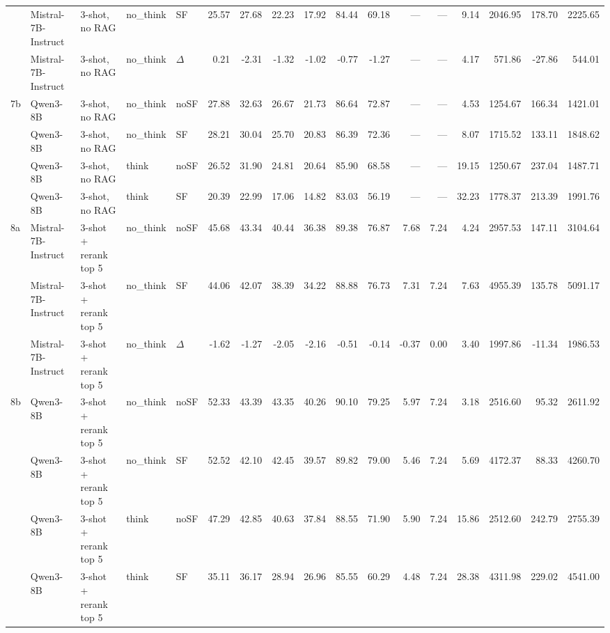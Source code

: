 \begin{landscape}
\begin{footnotesize}
\begin{longtable}{l l l l l r r r r r r r r r r r r}
 & Mistral-7B-Instruct & 3-shot, no RAG & no\_think & SF & 25.57 & 27.68 & 22.23 & 17.92 & 84.44 & 69.18 & --- & --- & 9.14 & 2046.95 & 178.70 & 2225.65 \\
 & Mistral-7B-Instruct & 3-shot, no RAG & no\_think & $\Delta$ & 0.21 & -2.31 & -1.32 & -1.02 & -0.77 & -1.27 & --- & --- & 4.17 & 571.86 & -27.86 & 544.01 \\
7b & Qwen3-8B & 3-shot, no RAG & no\_think & noSF & 27.88 & 32.63 & 26.67 & 21.73 & 86.64 & 72.87 & --- & --- & 4.53 & 1254.67 & 166.34 & 1421.01 \\
 & Qwen3-8B & 3-shot, no RAG & no\_think & SF & 28.21 & 30.04 & 25.70 & 20.83 & 86.39 & 72.36 & --- & --- & 8.07 & 1715.52 & 133.11 & 1848.62 \\
 & Qwen3-8B & 3-shot, no RAG & think & noSF & 26.52 & 31.90 & 24.81 & 20.64 & 85.90 & 68.58 & --- & --- & 19.15 & 1250.67 & 237.04 & 1487.71 \\
 & Qwen3-8B & 3-shot, no RAG & think & SF & 20.39 & 22.99 & 17.06 & 14.82 & 83.03 & 56.19 & --- & --- & 32.23 & 1778.37 & 213.39 & 1991.76 \\
\midrule
\rowcolor{tabhighlight}8a & Mistral-7B-Instruct & 3-shot + rerank top 5 & no\_think & noSF & 45.68 & 43.34 & 40.44 & 36.38 & 89.38 & 76.87 & 7.68 & 7.24 & 4.24 & 2957.53 & 147.11 & 3104.64 \\
 & Mistral-7B-Instruct & 3-shot + rerank top 5 & no\_think & SF & 44.06 & 42.07 & 38.39 & 34.22 & 88.88 & 76.73 & 7.31 & 7.24 & 7.63 & 4955.39 & 135.78 & 5091.17 \\
 & Mistral-7B-Instruct & 3-shot + rerank top 5 & no\_think & $\Delta$ & -1.62 & -1.27 & -2.05 & -2.16 & -0.51 & -0.14 & -0.37 & 0.00 & 3.40 & 1997.86 & -11.34 & 1986.53 \\
\rowcolor{tabhighlight}\textrightarrow{} 8b & Qwen3-8B & 3-shot + rerank top 5 & no\_think & noSF & 52.33 & 43.39 & 43.35 & 40.26 & 90.10 & 79.25 & 5.97 & 7.24 & 3.18 & 2516.60 & 95.32 & 2611.92 \\
 & Qwen3-8B & 3-shot + rerank top 5 & no\_think & SF & 52.52 & 42.10 & 42.45 & 39.57 & 89.82 & 79.00 & 5.46 & 7.24 & 5.69 & 4172.37 & 88.33 & 4260.70 \\
 & Qwen3-8B & 3-shot + rerank top 5 & think & noSF & 47.29 & 42.85 & 40.63 & 37.84 & 88.55 & 71.90 & 5.90 & 7.24 & 15.86 & 2512.60 & 242.79 & 2755.39 \\
 & Qwen3-8B & 3-shot + rerank top 5 & think & SF & 35.11 & 36.17 & 28.94 & 26.96 & 85.55 & 60.29 & 4.48 & 7.24 & 28.38 & 4311.98 & 229.02 & 4541.00 \\

\end{longtable}
\end{footnotesize}
\end{landscape}

